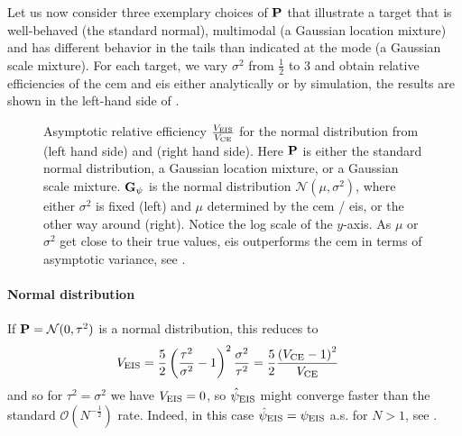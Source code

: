 \begin{example}
    Let us now consider three exemplary choices of $\P$ that illustrate a target that is well-behaved (the standard normal), multimodal (a Gaussian location mixture) and has different behavior in the tails than indicated at the mode (a Gaussian scale mixture). 
    For each target, we vary $\sigma^{2}$ from $\frac{1}{2}$ to $3$ and obtain relative efficiencies of the \gls{cem} and \gls{eis} either analytically or by simulation, the results are shown in the left-hand side of .

    \begin{figure}
        \centering

        \resizebox{\textwidth}{!}{%
        }
        \caption{Asymptotic relative efficiency $\frac{V_{\eis}}{V_{\ce}}$ for the normal distribution from  (left hand side) and  (right hand side). Here $\P$ is either the standard normal distribution, a Gaussian location mixture, or a Gaussian scale mixture. $\G_{\psi}$ is the normal distribution $\mathcal N(\mu, \sigma^{2})$, where either $\sigma^{2}$ is fixed (left) and $\mu$ determined by the \gls{cem} / \gls{eis}, or the other way around (right). Notice the log scale of the $y$-axis. As $\mu$ or $\sigma^{2}$ get close to their true values, \gls{eis} outperforms the \gls{cem} in terms of asymptotic variance, see . }
        \label{fig:are}
    \end{figure}

    
    \paragraph{Normal distribution}
    If $\P = \mathcal N(0, \tau^{2})$ is a normal distribution, this reduces to
    \begin{align*}
        V_{\eis} &= \frac{5}{2} \left( \frac{\tau^{2}}{\sigma^{2}} - 1 \right)^{2} \frac{\sigma^{2}}{\tau^{2}} = \frac{5}{2} \frac{\left( V_{\ce} - 1\right)^{2}}{V_{\ce}}
    \end{align*}
    and so for $\tau^{2} = \sigma^{2}$ we have $V_{\eis} = 0$, so $\hpeis$ might converge faster than the standard $\mathcal O( N^{-\frac{1}{2}})$ rate. Indeed, in this case $\hpeis = \peis$ a.s. for $N > 1$, see .

    

\end{example}
